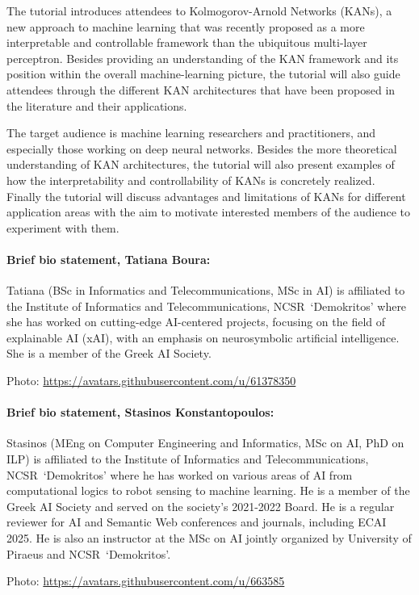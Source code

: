 \documentclass{ecai}
\newcommand{\quotes}[1]{`#1'}
\newcommand{\iit}{Institute of Informatics and Telecommunications, NCSR~\quotes{Demokritos}\xspace}
\begin{document}
The tutorial introduces attendees to Kolmogorov-Arnold Networks
(KANs), a new approach to machine learning that was recently proposed
as a more interpretable and controllable framework than the ubiquitous
multi-layer perceptron. Besides providing an understanding of the KAN
framework and its position within the overall machine-learning
picture, the tutorial will also guide attendees through the different
KAN architectures that have been proposed in the literature and their
applications.

The target audience is machine learning researchers and practitioners,
and especially those working on deep neural networks. Besides the more
theoretical understanding of KAN architectures, the tutorial will also
present examples of how the interpretability and controllability of
KANs is concretely realized. Finally the tutorial will discuss
advantages and limitations of KANs for different application areas
with the aim to motivate interested members of the audience to
experiment with them.



\paragraph{Brief bio statement, Tatiana Boura:}

Tatiana (BSc in Informatics and Telecommunications, MSc in AI) is
affiliated to the \iit where she has worked on
cutting-edge AI-centered projects, focusing on the field of explainable
AI (xAI), with an emphasis on neurosymbolic artificial intelligence.
She is a member of the Greek AI Society.

\noindent
Photo: \url{https://avatars.githubusercontent.com/u/61378350}

\paragraph{Brief bio statement, Stasinos Konstantopoulos:}

Stasinos (MEng on Computer Engineering and Informatics, MSc on AI,
PhD on ILP) is affiliated to the \iit where he has worked on various areas
of AI from computational logics to robot sensing to machine
learning. He is a member of the Greek AI Society and served on the
society's 2021-2022 Board. He is a regular reviewer for AI and
Semantic Web conferences and journals, including ECAI 2025. He is also
an instructor at the MSc on AI jointly organized by University of
Piraeus and NCSR~\quotes{Demokritos}.

\noindent
Photo: \url{https://avatars.githubusercontent.com/u/663585}
\end{document}

